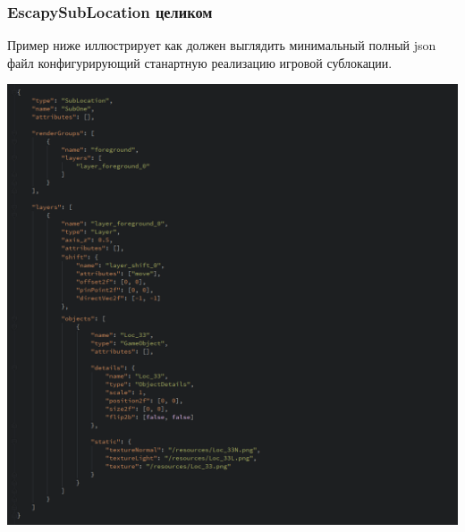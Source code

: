 \documentclass[11pt]{report}
\begin{document}
\subsubsection{EscapySubLocation целиком}
Пример ниже иллюстрирует как должен выглядить минимальный полный json файл конфигурирующий станартную реализацию игровой сублокации.
\begin{center}
	\includegraphics[width=1.2\linewidth]{img/21.png} 
  	\label{img:210} 
\end{center} 
\end{document}
